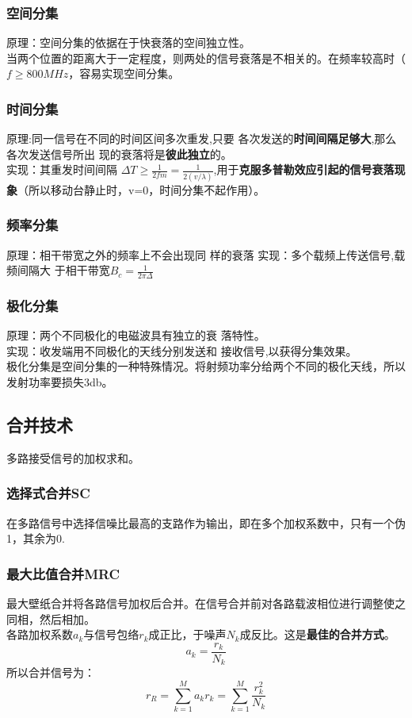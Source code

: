 \subsubsection{空间分集}
原理：空间分集的依据在于快衰落的空间独立性。\\当两个位置的距离大于一定程度，则两处的信号衰落是不相关的。在频率较高时（$ f \ge 800MHz$，容易实现空间分集。
\subsubsection{时间分集}
原理:同一信号在不同的时间区间多次重发,只要
各次发送的\textbf{时间间隔足够大},那么各次发送信号所出
现的衰落将是\textbf{彼此独立}的。\\
实现：其重发时间间隔 $\Delta T \ge \frac{1}{2fm} = \frac{1}{2(v/\lambda)}$,用于\textbf{克服多普勒效应引起的信号衰落现象}（所以移动台静止时，v=0，时间分集不起作用）。 
\subsubsection{频率分集}
原理：相干带宽之外的频率上不会出现同
样的衰落
实现：多个载频上传送信号,载频间隔大
于相干带宽$ B_c = \frac{1}{2\pi\Delta} $
\subsubsection{极化分集}
原理：两个不同极化的电磁波具有独立的衰
落特性。\\
实现：收发端用不同极化的天线分别发送和
接收信号,以获得分集效果。\\
极化分集是空间分集的一种特殊情况。将射频功率分给两个不同的极化天线，所以发射功率要损失3db。

\subsection{合并技术}
多路接受信号的加权求和。
\subsubsection{选择式合并SC}
在多路信号中选择信噪比最高的支路作为输出，即在多个加权系数中，只有一个伪1，其余为0.
\subsubsection{最大比值合并MRC}
最大壁纸合并将各路信号加权后合并。在信号合并前对各路载波相位进行调整使之同相，然后相加。\\
各路加权系数$ a_k $与信号包络$ r_k $成正比，于噪声$ N_k $成反比。这是\textbf{最佳的合并方式}。
\begin{equation}\label{key}
a_k = \frac{r_k}{N_k}
\end{equation}
所以合并信号为：
\begin{equation}\label{key}
r_R = \sum_{k=1}^{M}a_kr_k = \sum_{k=1}^{M}\frac{r_k^2}{N_k}
\end{equation}
